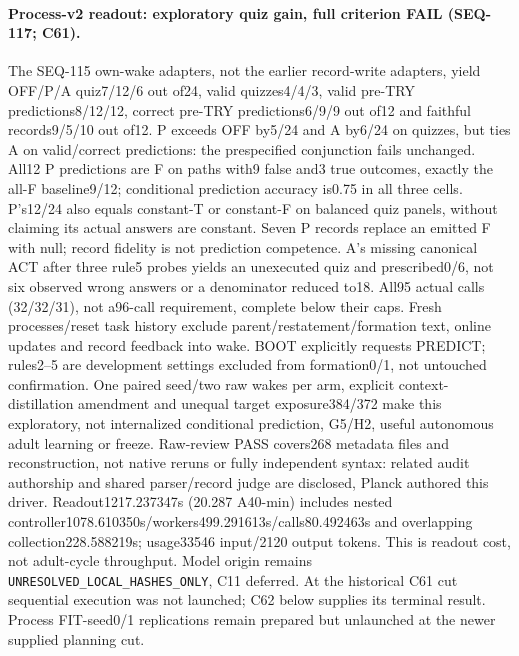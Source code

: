 \documentclass{article}
\begin{document}
\paragraph{Process-v2 readout: exploratory quiz gain, full criterion FAIL (SEQ-117; C61).} The SEQ-115 own-wake adapters, not the earlier record-write adapters, yield OFF/P/A quiz7/12/6 out of24, valid quizzes4/4/3, valid pre-TRY predictions8/12/12, correct pre-TRY predictions6/9/9 out of12 and faithful records9/5/10 out of12. P exceeds OFF by5/24 and A by6/24 on quizzes, but ties A on valid/correct predictions: the prespecified conjunction fails unchanged. All12 P predictions are F on paths with9 false and3 true outcomes, exactly the all-F baseline9/12; conditional prediction accuracy is0.75 in all three cells. P's12/24 also equals constant-T or constant-F on balanced quiz panels, without claiming its actual answers are constant. Seven P records replace an emitted F with null; record fidelity is not prediction competence. A's missing canonical ACT after three rule5 probes yields an unexecuted quiz and prescribed0/6, not six observed wrong answers or a denominator reduced to18. All95 actual calls (32/32/31), not a96-call requirement, complete below their caps. Fresh processes/reset task history exclude parent/restatement/formation text, online updates and record feedback into wake. BOOT explicitly requests PREDICT; rules2--5 are development settings excluded from formation0/1, not untouched confirmation. One paired seed/two raw wakes per arm, explicit context-distillation amendment and unequal target exposure384/372 make this exploratory, not internalized conditional prediction, G5/H2, useful autonomous adult learning or freeze. Raw-review PASS covers268 metadata files and reconstruction, not native reruns or fully independent syntax: related audit authorship and shared parser/record judge are disclosed, Planck authored this driver. Readout1217.237347s (20.287 A40-min) includes nested controller1078.610350s/workers499.291613s/calls80.492463s and overlapping collection228.588219s; usage33546 input/2120 output tokens. This is readout cost, not adult-cycle throughput. Model origin remains \texttt{UNRESOLVED\_LOCAL\_HASHES\_ONLY}, C11 deferred. At the historical C61 cut sequential execution was not launched; C62 below supplies its terminal result. Process FIT-seed0/1 replications remain prepared but unlaunched at the newer supplied planning cut.
\end{document}
